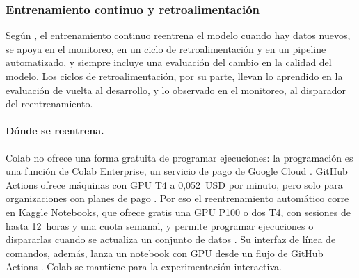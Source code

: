 \subsubsection{Entrenamiento continuo y retroalimentación}\label{sec:continuous}
Según \textcite{kreuzberger2023}, el entrenamiento continuo reentrena el modelo
cuando hay datos nuevos, se apoya en el monitoreo, en un ciclo de
retroalimentación y en un pipeline automatizado, y siempre incluye una
evaluación del cambio en la calidad del modelo. Los ciclos de
retroalimentación, por su parte, llevan lo aprendido en la evaluación de
vuelta al desarrollo, y lo observado en el monitoreo, al disparador del
reentrenamiento.

\paragraph{Dónde se reentrena.}
Colab no ofrece una forma gratuita de programar ejecuciones: la programación es
una función de Colab Enterprise, un servicio de pago de Google Cloud
\parencite{colabschedule}. GitHub Actions ofrece máquinas con GPU T4 a
0,052~USD por minuto, pero solo para organizaciones con planes de pago
\parencite{githubrunners}. Por eso el reentrenamiento automático corre en
Kaggle Notebooks, que ofrece gratis una GPU P100 o dos T4, con sesiones de
hasta 12~horas y una cuota semanal, y permite programar ejecuciones o
dispararlas cuando se actualiza un conjunto de datos \parencite{kagglenotebooks}.
Su interfaz de línea de comandos, además, lanza un notebook con GPU desde un
flujo de GitHub Actions \parencite{kagglecli}. Colab se mantiene para la
experimentación interactiva.

